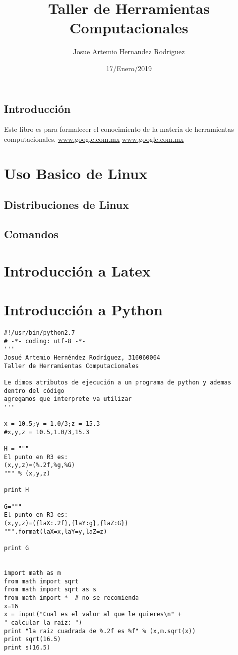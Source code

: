 \documentclass{book}
\title{Taller de Herramientas Computacionales}
\author{Josue Artemio Hernandez Rodriguez}
\date{17/Enero/2019}
\begin{document}
\maketitle
\tableofcontents
\section*{Introducción} Este libro es para formalecer el conocimiento de la materia de herramientas computacionales.
\url{www.google.com.mx}
\hyperref[Google]{www.google.com.mx}

\chapter{Uso Basico de Linux}
\section{Distribuciones de Linux}
\section{Comandos}
\chapter{Introducción a Latex}
\chapter{Introducción a Python}

\begin{verbatim}
#!/usr/bin/python2.7 
# -*- coding: utf-8 -*-
'''
Josué Artemio Hernéndez Rodríguez, 316060064
Taller de Herramientas Computacionales

Le dimos atributos de ejecución a un programa de python y ademas dentro del código
agregamos que interprete va utilizar
'''

x = 10.5;y = 1.0/3;z = 15.3
#x,y,z = 10.5,1.0/3,15.3

H = """
El punto en R3 es:
(x,y,z)=(%.2f,%g,%G)
""" % (x,y,z)

print H

G="""
El punto en R3 es:
(x,y,z)=({laX:.2f},{laY:g},{laZ:G})
""".format(laX=x,laY=y,laZ=z)

print G


import math as m
from math import sqrt
from math import sqrt as s
from math import *  # no se recomienda
x=16
x = input("Cual es el valor al que le quieres\n" +
" calcular la raiz: ")
print "la raiz cuadrada de %.2f es %f" % (x,m.sqrt(x))
print sqrt(16.5)
print s(16.5)
\end{verbatim}
\end{document}
